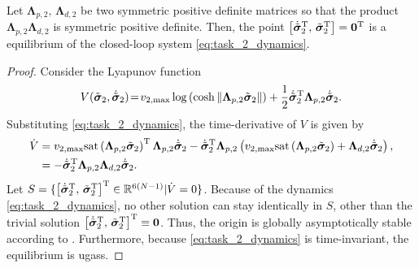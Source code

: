 \begin{theorem}
Let $\mathbf{\Lambda}_{p,2}, \, \mathbf{\Lambda}_{d,2}$ be two symmetric positive definite matrices so that the product $\mathbf{\Lambda}_{p,2} \mathbf{\Lambda}_{d,2}$ is symmetric positive definite. Then, the point $\bigl[\dot{\Tilde{\bm{\sigma}}}_2^{\mathrm{T}},\, \Tilde{\bm{\sigma}}_2^{\mathrm{T}}\bigr] = \mathbf{0}^{\mathrm{T}}$ is a  equilibrium of the closed-loop system \eqref{eq:task_2_dynamics}.
\end{theorem}

\begin{proof}
    Consider the Lyapunov function
    \begin{equation}
  V(\Tilde{\bm{\sigma}}_2, \dot{\Tilde{\bm{\sigma}}}_2) \!=\! v_{2,\max}\log\left(\cosh{\|\mathbf{\Lambda}_{p,2}\Tilde{\bm{\sigma}}_{2}\|}\right) + \frac{1}{2}\dot{\Tilde{\bm{\sigma}}}_2^{\mathrm{T}}\mathbf{\Lambda}_{p,2}\dot{\Tilde{\bm{\sigma}}}_2.
\end{equation}
Substituting \eqref{eq:task_2_dynamics}, the time-derivative of $V$ is given by
\begin{align}
    \dot{V} &= v_{2,\max}\mathrm{sat}\left(\mathbf{\Lambda}_{p,2}\Tilde{\bm{\sigma}}_{2}\right)^{\mathrm{T}} \mathbf{\Lambda}_{p,2} \dot{\Tilde{\bm{\sigma}}}_2 
                -\dot{\Tilde{\bm{\sigma}}}_2^{\mathrm{T}} \mathbf{\Lambda}_{p,2}\left(v_{2,\max}\mathrm{sat}\left(\mathbf{\Lambda}_{p,2}\Tilde{\bm{\sigma}}_{2}\right) + \mathbf{\Lambda}_{d,2}\dot{\Tilde{\bm{\sigma}}}_2\right), \nonumber \\
    &= -\dot{\Tilde{\bm{\sigma}}}_2^{\mathrm{T}}\mathbf{\Lambda}_{p,2} \mathbf{\Lambda}_{d,2}\dot{\Tilde{\bm{\sigma}}}_2.
\end{align}
Let $S = \{\bigl[\dot{\Tilde{\bm{\sigma}}}_2^{\mathrm{T}},\, \Tilde{\bm{\sigma}}_2^{\mathrm{T}}\bigr]^{\mathrm{T}} \in \mathbb{R}^{6(N-1)} | \dot{V} = 0\}$. Because of the dynamics \eqref{eq:task_2_dynamics}, no other solution can stay identically in $S$, other than the trivial solution $\bigl[\dot{\Tilde{\bm{\sigma}}}_2^{\mathrm{T}},\, \Tilde{\bm{\sigma}}_2^{\mathrm{T}}\bigr]^{\mathrm{T}} \equiv \mathbf{0}$. Thus, the origin is globally asymptotically stable according to \cite[Corollary 4.2]{khalil_nonlinear_2002}. Furthermore, because \eqref{eq:task_2_dynamics} is time-invariant, the equilibrium is \glspl{ugas}.
\end{proof}


